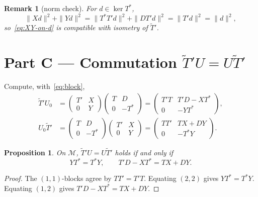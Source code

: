 \documentclass[11pt]{article}
\newtheorem{proposition}{Proposition}
\newtheorem{remark}{Remark}
\begin{document}
\begin{remark}[norm check]
For \(d\in\ker T^*\),
\[
\|Xd\|^2+\|Yd\|^2
=
\|T^*T'd\|^2+\|DT'd\|^2
=
\|T'd\|^2
=
\|d\|^2,
\]
so~\eqref{eq:XY-on-d} is compatible with isometry of \(\widetilde{T}'\).
\end{remark}

\bigskip
\section*{Part C --- Commutation \(\widetilde{T}'U=U\widetilde{T}'\)}

Compute, with~\eqref{eq:block},
\begin{align*}
\widetilde{T}'U_0
&=
\begin{pmatrix}T'&X\\ 0&Y\end{pmatrix}
\begin{pmatrix}T&D\\ 0&-T^*\end{pmatrix}
=
\begin{pmatrix}
T'T & T'D-XT^* \\
0 & -YT^*
\end{pmatrix},
\\[1mm]
U_0\widetilde{T}'
&=
\begin{pmatrix}T&D\\ 0&-T^*\end{pmatrix}
\begin{pmatrix}T'&X\\ 0&Y\end{pmatrix}
=
\begin{pmatrix}
TT' & TX+DY \\
0 & -T^*Y
\end{pmatrix}.
\end{align*}

\begin{proposition}
On \(\mathcal{M}\), \(\widetilde{T}'U=U\widetilde{T}'\) holds if and only if
\begin{equation}
\label{eq:comm}
\boxed{
YT^*=T^*Y,
\qquad
T'D-XT^*=TX+DY.
}
\end{equation}
\end{proposition}

\begin{proof}
The \((1,1)\)-blocks agree by \(TT'=T'T\). Equating \((2,2)\) gives
\(YT^*=T^*Y\). Equating \((1,2)\) gives \(T'D-XT^*=TX+DY\).
\end{proof}
\end{document}
